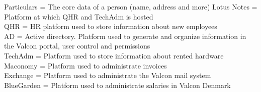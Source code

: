 Particulars 	=	The core data of a person (name, address and more)
Lotus Notes		=	Platform at which QHR and TechAdm is hosted	\\
QHR				=	HR platform used to store information about new employees	\\
AD				=	Active directory. Platform used to generate and organize information in the Valcon portal, user control and permissions	\\
TechAdm			=	Platform used to store information about rented hardware	\\
Maconomy		=	Platform used to administrate invoices	\\
Exchange		=	Platform used to administrate the Valcon mail system	\\
BlueGarden		=	Platform used to administrate salaries in Valcon Denmark	\\